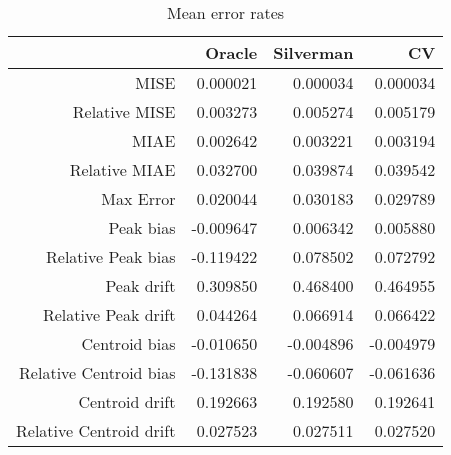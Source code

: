\begin{table}[ht]
\centering
\begin{tabular}{rrrr}
  \hline
 & Oracle & Silverman & CV \\ 
  \hline
MISE & 0.000021 & 0.000034 & 0.000034 \\ 
  Relative MISE & 0.003273 & 0.005274 & 0.005179 \\ 
  MIAE & 0.002642 & 0.003221 & 0.003194 \\ 
  Relative MIAE & 0.032700 & 0.039874 & 0.039542 \\ 
  Max Error & 0.020044 & 0.030183 & 0.029789 \\ 
  Peak bias & -0.009647 & 0.006342 & 0.005880 \\ 
  Relative Peak bias & -0.119422 & 0.078502 & 0.072792 \\ 
  Peak drift & 0.309850 & 0.468400 & 0.464955 \\ 
  Relative Peak drift & 0.044264 & 0.066914 & 0.066422 \\ 
  Centroid bias & -0.010650 & -0.004896 & -0.004979 \\ 
  Relative Centroid bias & -0.131838 & -0.060607 & -0.061636 \\ 
  Centroid drift & 0.192663 & 0.192580 & 0.192641 \\ 
  Relative Centroid drift & 0.027523 & 0.027511 & 0.027520 \\ 
   \hline
\end{tabular}
\caption{Mean error rates} 
\label{tbl:mean_error_rates}
\end{table}

